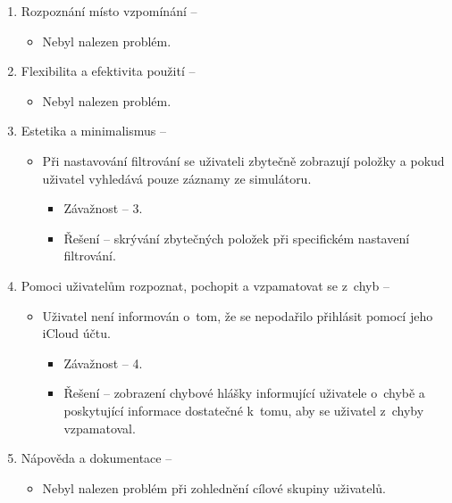 \documentclass[thesis=M,czech]{FITthesis}[2012/06/26]
\begin{document}
\begin{enumerate}
\item Rozpoznání místo vzpomínání -- 
\begin{itemize}
 	\item Nebyl nalezen problém.
\end{itemize}
 
\item Flexibilita a efektivita použití -- 
\begin{itemize}
 	\item Nebyl nalezen problém.
\end{itemize}
 
\item Estetika a minimalismus --
\begin{itemize}
\item Při nastavování filtrování se uživateli zbytečně zobrazují položky  a  pokud uživatel vyhledává pouze záznamy ze simulátoru.
\begin{itemize}
	\item Závažnost -- 3.
	\item Řešení -- skrývání zbytečných položek při specifickém nastavení filtrování.
\end{itemize}
\end{itemize}  
  
\item Pomoci uživatelům rozpoznat, pochopit a vzpamatovat se z~chyb -- 
\begin{itemize}
\item Uživatel není informován o~tom, že se nepodařilo přihlásit pomocí jeho iCloud účtu.
\begin{itemize}
	\item Závažnost -- 4.
	\item Řešení -- zobrazení chybové hlášky informující uživatele o~chybě a poskytující informace dostatečné  k~tomu, aby se uživatel z~chyby vzpamatoval.
\end{itemize}
\end{itemize}

\item Nápověda a dokumentace -- 
\begin{itemize}
 	\item Nebyl nalezen problém při zohlednění cílové skupiny uživatelů.
\end{itemize}
\end{enumerate}
\end{document}
